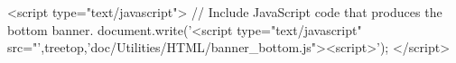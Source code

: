 \begin{rawhtml}
<script type="text/javascript">
// Include JavaScript code that produces the bottom banner.
document.write('<script type="text/javascript" src="',treetop,'doc/Utilities/HTML/banner_bottom.js"><\/script>');
</script>
\end{rawhtml}

